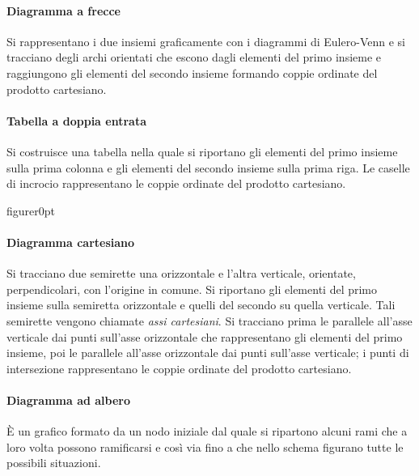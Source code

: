 {\paragraph{Diagramma a frecce}
Si rappresentano i due insiemi graficamente
con i diagrammi di Eulero-Venn e si tracciano degli archi orientati che
escono dagli elementi del primo insieme e raggiungono gli elementi del
secondo insieme formando coppie ordinate del prodotto cartesiano.
\begin{center}

\end{center}

\paragraph{Tabella a doppia entrata}
Si costruisce una tabella nella quale si riportano gli elementi del
primo insieme sulla prima colonna e gli elementi del secondo insieme
sulla prima riga. Le caselle di incrocio rappresentano le coppie
ordinate del prodotto cartesiano.
\begin{center}
 
\end{center}

\begin{wrapfloat}{figure}{r}{0pt}
 
\end{wrapfloat}

\paragraph{Diagramma cartesiano}
Si tracciano due semirette una orizzontale e l'altra
verticale, orientate, perpendicolari, con l'origine
in comune. Si riportano gli elementi del primo insieme sulla semiretta
orizzontale e quelli del secondo su quella verticale. Tali semirette
vengono chiamate \emph{assi cartesiani}. Si tracciano prima le
parallele all'asse verticale dai punti
sull'asse orizzontale che rappresentano gli elementi
del primo insieme, poi le parallele all'asse
orizzontale dai punti sull'asse verticale; i punti di
intersezione rappresentano le coppie ordinate del prodotto
cartesiano.

\paragraph{Diagramma ad albero}
È un grafico formato da un nodo iniziale dal quale si ripartono alcuni
rami che a loro volta possono ramificarsi e così via fino a che nello
schema figurano tutte le possibili situazioni.

}
